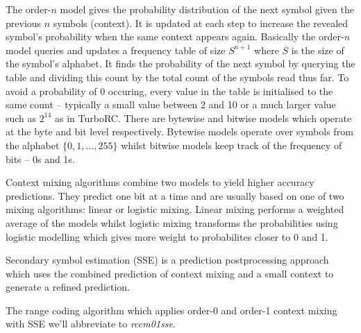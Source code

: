 The order-$n$ model gives the probability distribution of the next symbol given
the previous $n$ symbols (context). It is updated at each step to increase the
revealed symbol's probability when the same context appears again.
Basically the order-$n$ model queries and updates a frequency table of
size $S^{n+1}$ where $S$ is the size of the symbol's alphabet.
It finds the probability of the next symbol by querying the table and
dividing this count by the total count of the symbols read thus far. To avoid a
probability of 0 occuring, every value in the table is initialised to the
same count -- typically a small value between 2 and 10 or a much larger
value such as $2^{14}$ as in TurboRC.
There are bytewise and bitwise models which operate at the byte and bit level
respectively. Bytewise models operate over symbols from the alphabet
$\{0,1,\dots,255\}$ whilst bitwise models keep track of the frequency of
bits -- 0s and 1s.

Context mixing algorithms combine two models to yield higher accuracy
predictions. They predict one bit at a time and are usually based on one of
two mixing algorithms: linear or logistic mixing. Linear mixing performs
a weighted average of the models whilst logistic mixing transforms the
probabilities using logistic modelling which gives more weight to
probabilites closer to 0 and 1.

Secondary symbol estimation (SSE) is a prediction postprocessing approach which
uses the combined prediction of context mixing and a small context to generate a
refined prediction.

The range coding algorithm which applies order-0 and order-1
context mixing with SSE we'll abbreviate to \textit{rccm01sse}.

